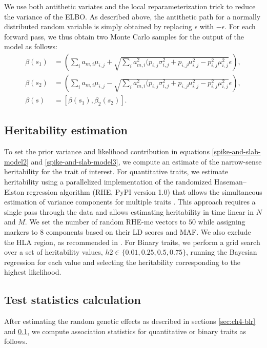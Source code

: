 %
We use both antithetic variates and the local reparameterization trick to reduce the variance of the ELBO.
%
As described above, the antithetic path for a normally distributed random variable is simply obtained by replacing $\epsilon$ with $-\epsilon$.
%
For each forward pass, we thus obtain two Monte Carlo samples for the output of the model as follows: 
\begin{align}
    \beta(s_1) &=  (\sum_{i}a_{m,i}\mu_{i,j} + \sqrt{\sum_{i}a^2_{m,i}(p_{i,j}\sigma^2_{i,j} + p_{i,j}\mu^2_{i,j} - p^2_{i,j}\mu^2_{i,j}} \epsilon ), \nonumber \\
    \beta(s_2) &= (\sum_{i}a_{m,i}\mu_{i,j} - \sqrt{\sum_{i}a^2_{m,i}(p_{i,j}\sigma^2_{i,j} + p_{i,j}\mu^2_{i,j} - p^2_{i,j}\mu^2_{i,j}} \epsilon ), \nonumber \\
    \beta(s) &= [\beta(s_1), \beta_2(s_2)].
\end{align}

\subsection{Heritability estimation}
\label{methods:h2}
%
To set the prior variance and likelihood contribution in equations \ref{spike-and-slab-model2} and \ref{spike-and-slab-model3}, we compute an estimate of the narrow-sense heritability for the trait of interest.
%
For quantitative traits, we estimate heritability using a parallelized implementation of the randomized Haseman–Elston regression algorithm\cite{wu2018scalable,pazokitoroudi2020efficient} (RHE, PyPI version 1.0) that allows the simultaneous estimation of variance components for multiple traits \cite{zhu2024ARGRHE}.
%
This approach requires a single pass through the data and allows estimating heritability in time linear in $N$ and $M$.
%
We set the number of random RHE-mc vectors to $50$ while assigning markers to $8$ components based on their LD scores and MAF. 
%
We also exclude the HLA region, as recommended in \cite{pazokitoroudi2020efficient}.
%
For Binary traits, we perform a grid search over a set of heritability values, $h2 \in \{0.01, 0.25, 0.5, 0.75\}$, running the Bayesian regression for each value and selecting the heritability corresponding to the highest likelihood.
%


\subsection{Test statistics calculation}
\label{methods:test_stats}
%
After estimating the random genetic effects as described in sections \ref{sec:ch4-blr} and \ref{methods:h2}, we compute association statistics for quantitative or binary traits as follows.
%
